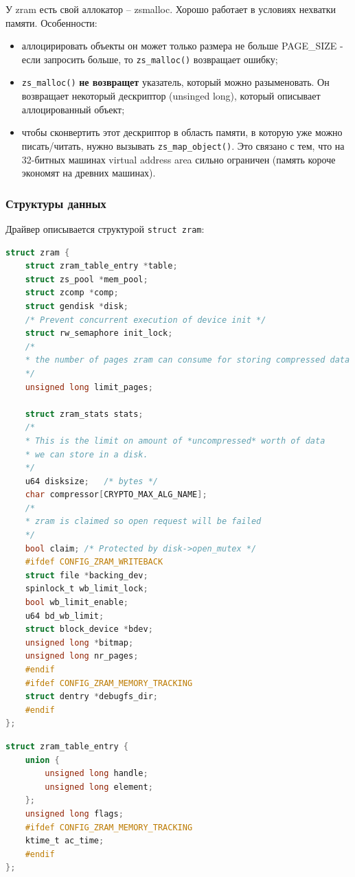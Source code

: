 \documentclass[12pt]{report}
\begin{document}
У zram есть свой аллокатор -- zsmalloc. Хорошо работает в условиях нехватки памяти. Особенности:

\begin{itemize}
	\item аллоцирировать объекты он может только размера не больше PAGE\_SIZE - если запросить больше, то \texttt{zs\_malloc()} возвращает ошибку;
	\item \texttt{zs\_malloc()} \textbf{не возвращет} указатель, который можно разыменовать. Он возвращает некоторый дескриптор (unsinged long), который описывает аллоцированный объект;
	\item чтобы сконвертить этот дескриптор в область памяти, в которую уже можно писать/читать, нужно вызывать \texttt{zs\_map\_object()}. Это связано с тем, что на 32-битных машинах virtual address area сильно ограничен (память короче экономят на древних машинах).
\end{itemize}

\subsubsection{Структуры данных}

Драйвер описывается структурой \texttt{struct zram}:

\begin{lstlisting}[language=c]
struct zram {
	struct zram_table_entry *table;
	struct zs_pool *mem_pool;
	struct zcomp *comp;
	struct gendisk *disk;
	/* Prevent concurrent execution of device init */
	struct rw_semaphore init_lock;
	/*
	* the number of pages zram can consume for storing compressed data
	*/
	unsigned long limit_pages;
	
	struct zram_stats stats;
	/*
	* This is the limit on amount of *uncompressed* worth of data
	* we can store in a disk.
	*/
	u64 disksize;	/* bytes */
	char compressor[CRYPTO_MAX_ALG_NAME];
	/*
	* zram is claimed so open request will be failed
	*/
	bool claim; /* Protected by disk->open_mutex */
	#ifdef CONFIG_ZRAM_WRITEBACK
	struct file *backing_dev;
	spinlock_t wb_limit_lock;
	bool wb_limit_enable;
	u64 bd_wb_limit;
	struct block_device *bdev;
	unsigned long *bitmap;
	unsigned long nr_pages;
	#endif
	#ifdef CONFIG_ZRAM_MEMORY_TRACKING
	struct dentry *debugfs_dir;
	#endif
};
\end{lstlisting}

\begin{lstlisting}[language=c]
struct zram_table_entry {
	union {
		unsigned long handle;
		unsigned long element;
	};
	unsigned long flags;
	#ifdef CONFIG_ZRAM_MEMORY_TRACKING
	ktime_t ac_time;
	#endif
};
\end{lstlisting}
\end{document}
